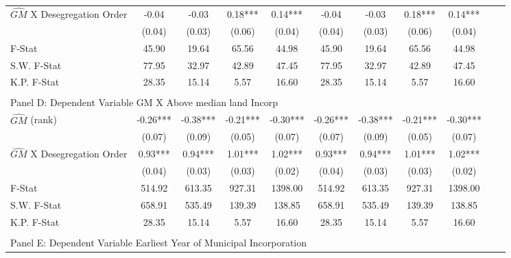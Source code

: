 \begin{table}[htbp]
\begin{threeparttable}
\begin{tabular}{l*{10}{c}}
\addlinespace
$\hat{GM}$ X Desegregation Order&      -0.04   &      -0.03   &       0.18***&       0.14***&      -0.04   &      -0.03   &       0.18***&       0.14***\\
                &     (0.04)   &     (0.03)   &     (0.06)   &     (0.04)   &     (0.04)   &     (0.03)   &     (0.06)   &     (0.04)   \\
\midrule
F-Stat          &      45.90   &      19.64   &      65.56   &      44.98   &      45.90   &      19.64   &      65.56   &      44.98   \\
S.W. F-Stat     &      77.95   &      32.97   &      42.89   &      47.45   &      77.95   &      32.97   &      42.89   &      47.45   \\
K.P. F-Stat     &      28.35   &      15.14   &       5.57   &      16.60   &      28.35   &      15.14   &       5.57   &      16.60   \\
\cmidrule[\heavyrulewidth](lr){1-9} \\ \cmidrule[\heavyrulewidth](lr){1-9}
\multicolumn{8}{l}{Panel D: Dependent Variable GM X Above median land Incorp}\\
\cmidrule(lr){1-9}
$\hat{GM}$ (rank)&      -0.26***&      -0.38***&      -0.21***&      -0.30***&      -0.26***&      -0.38***&      -0.21***&      -0.30***\\
                &     (0.07)   &     (0.09)   &     (0.05)   &     (0.07)   &     (0.07)   &     (0.09)   &     (0.05)   &     (0.07)   \\
\addlinespace
$\hat{GM}$ X Desegregation Order&       0.93***&       0.94***&       1.01***&       1.02***&       0.93***&       0.94***&       1.01***&       1.02***\\
                &     (0.04)   &     (0.03)   &     (0.03)   &     (0.02)   &     (0.04)   &     (0.03)   &     (0.03)   &     (0.02)   \\
\midrule
F-Stat          &     514.92   &     613.35   &     927.31   &    1398.00   &     514.92   &     613.35   &     927.31   &    1398.00   \\
S.W. F-Stat     &     658.91   &     535.49   &     139.39   &     138.85   &     658.91   &     535.49   &     139.39   &     138.85   \\
K.P. F-Stat     &      28.35   &      15.14   &       5.57   &      16.60   &      28.35   &      15.14   &       5.57   &      16.60   \\
\cmidrule[\heavyrulewidth](lr){1-9} \\ \cmidrule[\heavyrulewidth](lr){1-9}
\multicolumn{8}{l}{Panel E: Dependent Variable Earliest Year of Municipal Incorporation}\\

\end{tabular}
\end{threeparttable}
\end{table}
